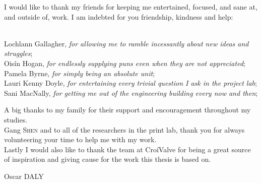 \mynewline
I would like to thank my friends for keeping me entertained, focused, and sane at, and outside of, work.
I am indebted for you friendship, kindness and help:{\small
\\\hspace*{0.3cm} Lochlann Gallagher, \textit{for allowing me to ramble incessantly about new ideas and struggles};
\\\hspace*{0.3cm} Oisín Hogan, \textit{for endlessly supplying puns even when they are not appreciated};
\\\hspace*{0.3cm} Pamela Byrne, \textit{for simply being an absolute unit};
\\\hspace*{0.3cm} Lauri Kenny Doyle, \textit{for entertaining every trivial question I ask in the project lab};
\\\hspace*{0.3cm} Sani MacNally, \textit{for getting me out of the engineering building every now and then};

}
A big thanks to my family for their support and encouragement throughout my studies.
\\Gang \textsc{Shen} and to all of the researchers in the print lab, thank you for always volunteering your time to help me with my work.
\\Lastly I would also like to thank the team at CroíValve for being a great source of inspiration and giving cause for the work this thesis is based on.
\begin{flushright}
    Oscar DALY
\end{flushright}